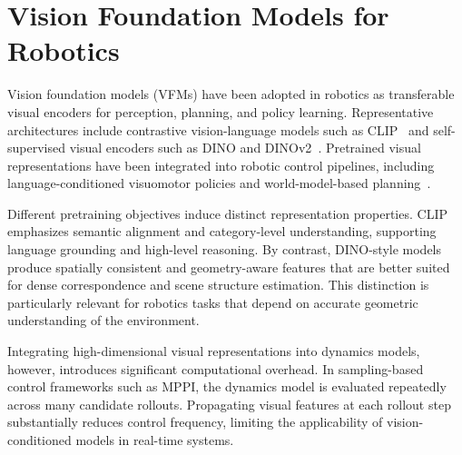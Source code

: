 \section{Vision Foundation Models for Robotics}
\label{sec:rw-vision}

Vision foundation models (VFMs) have been adopted in robotics as transferable visual encoders for perception, planning, and policy learning. Representative architectures include contrastive vision-language models such as CLIP~\cite{radford2021learning} and self-supervised visual encoders such as DINO and DINOv2~\cite{caron2021emerging,oquab2023dinov2}. Pretrained visual representations have been integrated into robotic control pipelines, including language-conditioned visuomotor policies and world-model-based planning~\cite{kang2024clip,zhou2024dino}.

Different pretraining objectives induce distinct representation properties. CLIP emphasizes semantic alignment and category-level understanding, supporting language grounding and high-level reasoning. By contrast, DINO-style models produce spatially consistent and geometry-aware features that are better suited for dense correspondence and scene structure estimation. This distinction is particularly relevant for robotics tasks that depend on accurate geometric understanding of the environment.

Integrating high-dimensional visual representations into dynamics models, however, introduces significant computational overhead. In sampling-based control frameworks such as MPPI, the dynamics model is evaluated repeatedly across many candidate rollouts. Propagating visual features at each rollout step substantially reduces control frequency, limiting the applicability of vision-conditioned models in real-time systems.